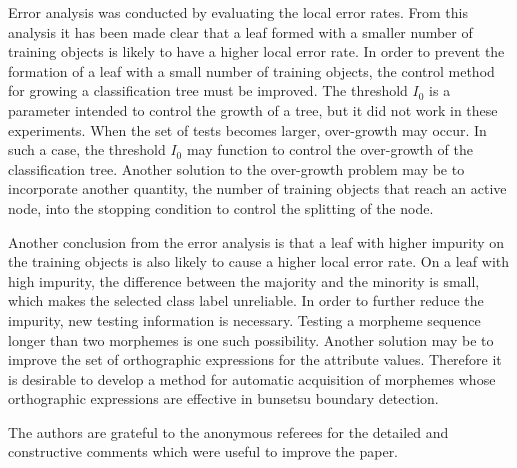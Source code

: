   Error analysis was conducted by evaluating the local error rates.
From this analysis it has been made clear  that a leaf formed with  
a smaller number  
of training objects is likely to have a higher  local error  rate. In order to
prevent the formation of a  leaf with a small number  of training
objects, the
control method for growing a classification tree must be improved. The 
threshold $I_0$ is a parameter intended to control the growth of a
tree, but it  did not work in these experiments. When  the set of
tests becomes larger, over-growth may occur.
In such a case, the threshold $I_0$ may function  to  control the  
over-growth of the classification tree. 
Another solution to the over-growth  problem may be to incorporate another quantity,
the number of training objects  that reach an active node, into the stopping condition
to  control the splitting of the node.

  Another conclusion from the error analysis is that a leaf with higher 
impurity on the
training objects is also likely to cause a higher  local error rate.
On a leaf with high impurity, the difference between the majority
and the minority is small, which makes the selected class  label
unreliable.
In order to further reduce the impurity, new testing information is
necessary.
Testing  a morpheme sequence longer than two morphemes is one such possibility. Another
solution may be
to improve the set of orthographic expressions for the attribute
values. 
Therefore it is desirable to develop a method for automatic
acquisition of morphemes
whose orthographic expressions are effective in bunsetsu boundary
detection.

\acknowledgment

The authors are grateful to the anonymous referees for the detailed and
constructive comments which were useful to improve the paper.


